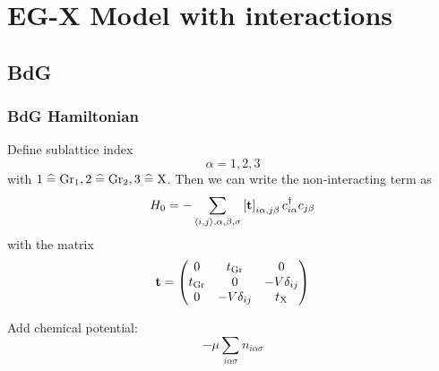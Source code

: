 \documentclass[../main.tex]{subfiles}
\begin{document}
\chapter{EG-X Model with interactions}

\section{BdG}

\subsection{BdG Hamiltonian}

Define sublattice index
\begin{equation}
    \alpha = 1, 2, 3
\end{equation}
with \(1 \mathrel{\widehat{=}} \mathrm{Gr}_1, 2 \mathrel{\widehat{=}} \mathrm{Gr}_2, 3 \mathrel{\widehat{=}} \mathrm{X}\).
Then we can write the non-interacting term as
\begin{equation}
    H_0 = - \sum_{\langle i, j \rangle, \alpha, \beta, \sigma} \left[\textbf{t} \right]_{i\alpha,j\beta} c_{i\alpha}^{\dagger} c_{j\beta}
\end{equation}
with the matrix
\begin{equation}
    \textbf{t} = \begin{pmatrix}
                  0 & t_{\mathrm{Gr}} & 0 \\
                  t_{\mathrm{Gr}} & 0 & -V \delta_{ij} \\
                  0 & -V \delta_{ij} & t_{\mathrm{X}} \\
    \end{pmatrix}
\end{equation}

Add chemical potential:
\begin{equation}
    -\mu \sum_{i \alpha \sigma} n_{i \alpha \sigma}
\end{equation}
\end{document}
